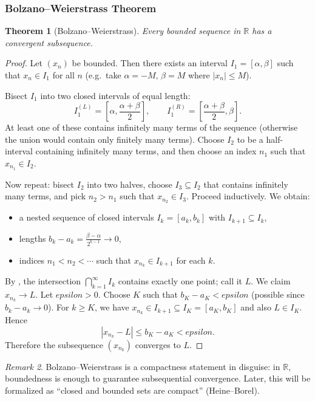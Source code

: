 \documentclass[12pt]{article}
\numberwithin{equation}{section}
\def\abs#1{|#1|}
\def\eps{epsilon}
\newcommand{\RR}{\mathbb{R}}
\DeclarePairedDelimiter{\abs}{\lvert}{\rvert}
\newcommand{\eps}{\varepsilon}               %
\theoremstyle{plain}
\newtheorem{theorem}{Theorem}[section]
\theoremstyle{definition}
\theoremstyle{remark}
\newtheorem{remark}[theorem]{Remark}
\begin{document}
\subsubsection{Bolzano--Weierstrass Theorem}

\begin{theorem}[Bolzano--Weierstrass]\label{thm:bolzano-weierstrass}
Every bounded sequence in $\RR$ has a convergent subsequence.
\end{theorem}

\begin{proof}
Let $(x_n)$ be bounded. Then there exists an interval $I_1=[\alpha,\beta]$ such that $x_n\in I_1$ for all $n$ (e.g.\ take $\alpha=-M$, $\beta=M$ where $\abs{x_n}\le M$).

Bisect $I_1$ into two closed intervals of equal length:
\[
I_1^{(L)}=\left[\alpha,\frac{\alpha+\beta}{2}\right],
\qquad
I_1^{(R)}=\left[\frac{\alpha+\beta}{2},\beta\right].
\]
At least one of these contains infinitely many terms of the sequence (otherwise the union would contain only finitely many terms).
Choose $I_2$ to be a half-interval containing infinitely many terms, and then choose an index $n_1$ such that $x_{n_1}\in I_2$.

Now repeat: bisect $I_2$ into two halves, choose $I_3\subseteq I_2$ that contains infinitely many terms, and pick $n_2>n_1$ such that $x_{n_2}\in I_3$.
Proceed inductively. We obtain:
\begin{itemize}
\item a nested sequence of closed intervals $I_k=[a_k,b_k]$ with $I_{k+1}\subseteq I_k$,
\item lengths $b_k-a_k=\frac{\beta-\alpha}{2^{k-1}}\to 0$,
\item indices $n_1<n_2<\cdots$ such that $x_{n_k}\in I_{k+1}$ for each $k$.
\end{itemize}

By , the intersection $\bigcap_{k=1}^{\infty} I_k$ contains exactly one point; call it $L$.
We claim $x_{n_k}\to L$. Let $\eps>0$.
Choose $K$ such that $b_K-a_K<\eps$ (possible since $b_k-a_k\to 0$).
For $k\ge K$, we have $x_{n_k}\in I_{k+1}\subseteq I_K=[a_K,b_K]$ and also $L\in I_K$.
Hence
\[
\abs{x_{n_k}-L}\le b_K-a_K<\eps.
\]
Therefore the subsequence $(x_{n_k})$ converges to $L$.
\end{proof}

\begin{remark}
Bolzano--Weierstrass is a compactness statement in disguise: in $\RR$, boundedness is enough to guarantee subsequential convergence.
Later, this will be formalized as ``closed and bounded sets are compact'' (Heine--Borel).
\end{remark}
\end{document}

